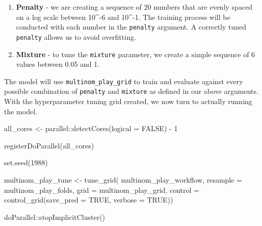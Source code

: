 \documentclass[
  letterpaper,
]{krantz}
\newenvironment{Shaded}{\begin{snugshade}}{\end{snugshade}}
\newcommand{\AttributeTok}[1]{\textcolor[rgb]{0.40,0.45,0.13}{#1}}
\newcommand{\ConstantTok}[1]{\textcolor[rgb]{0.56,0.35,0.01}{#1}}
\newcommand{\DecValTok}[1]{\textcolor[rgb]{0.68,0.00,0.00}{#1}}
\newcommand{\FunctionTok}[1]{\textcolor[rgb]{0.28,0.35,0.67}{#1}}
\newcommand{\NormalTok}[1]{\textcolor[rgb]{0.00,0.23,0.31}{#1}}
\newcommand{\OtherTok}[1]{\textcolor[rgb]{0.00,0.23,0.31}{#1}}
\newcommand{\SpecialCharTok}[1]{\textcolor[rgb]{0.37,0.37,0.37}{#1}}
\providecommand{\tightlist}{%
  \setlength{\itemsep}{0pt}\setlength{\parskip}{0pt}}\usepackage{longtable,booktabs,array}
\begin{document}
\begin{enumerate}
\def\labelenumi{\arabic{enumi}.}
\tightlist
\item
  \textbf{Penalty} - we are creating a sequence of 20 numbers that are
  evenly spaced on a log scale between 10\^{}-6 and 10\^{}-1. The
  training process will be conducted with each number in the
  \texttt{penalty} argument. A correctly tuned \texttt{penalty} allows
  us to avoid overfitting.
\item
  \textbf{Mixture} - to tune the \texttt{mixture} parameter, we create a
  simple sequence of 6 values between 0.05 and 1.
\end{enumerate}

The model will use \texttt{multinom\_play\_grid} to train and evaluate
against every possible combination of \texttt{penalty} and
\texttt{mixture} as defined in our above arguments. With the
hyperparameter tuning grid created, we now turn to actually running the
model.

\begin{Shaded}
\begin{Highlighting}[]
\NormalTok{all\_cores }\OtherTok{\textless{}{-}}\NormalTok{ parallel}\SpecialCharTok{::}\FunctionTok{detectCores}\NormalTok{(}\AttributeTok{logical =} \ConstantTok{FALSE}\NormalTok{) }\SpecialCharTok{{-}} \DecValTok{1}

\FunctionTok{registerDoParallel}\NormalTok{(all\_cores)}

\FunctionTok{set.seed}\NormalTok{(}\DecValTok{1988}\NormalTok{)}

\NormalTok{multinom\_play\_tune }\OtherTok{\textless{}{-}} \FunctionTok{tune\_grid}\NormalTok{(}
\NormalTok{  multinom\_play\_workflow,}
  \AttributeTok{resample =}\NormalTok{ multinom\_play\_folds,}
  \AttributeTok{grid =}\NormalTok{ multinom\_play\_grid,}
  \AttributeTok{control =} \FunctionTok{control\_grid}\NormalTok{(}\AttributeTok{save\_pred =} \ConstantTok{TRUE}\NormalTok{,}
                         \AttributeTok{verbose =} \ConstantTok{TRUE}\NormalTok{))}

\NormalTok{doParallel}\SpecialCharTok{::}\FunctionTok{stopImplicitCluster}\NormalTok{()}
\end{Highlighting}
\end{Shaded}
\end{document}

